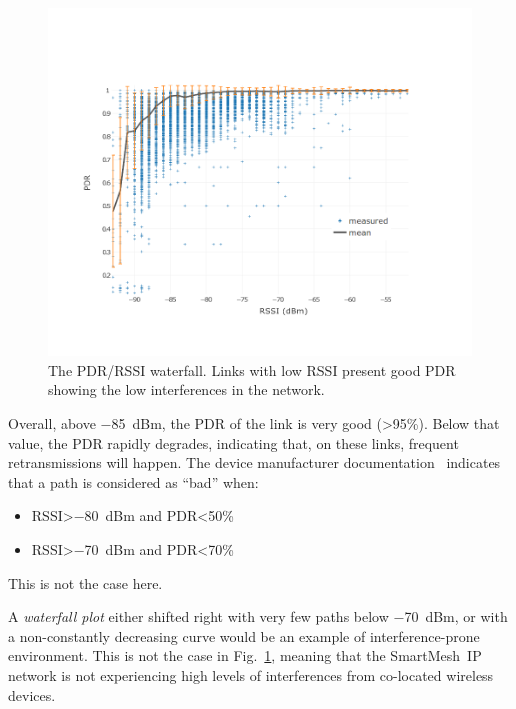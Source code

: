 \documentclass{sig-alternate}
\newcommand{\smip}                {SmartMesh~IP\xspace}
\begin{document}
\begin{figure}
    \centering
    \includegraphics[width=\columnwidth]{waterfall}
    \caption{
        The PDR/RSSI waterfall.
        Links with low RSSI present good PDR showing the low interferences in the network.
    }
    \label{fig:waterfall}
\end{figure}

Overall, above $-$85~dBm, the PDR of the link is very good (>95\%).
Below that value, the PDR rapidly degrades, indicating that, on these links, frequent retransmissions will happen.
The device manufacturer documentation~\cite{smip_app_note} indicates that a path is considered as ``bad'' when:

\begin{itemize}
  \item RSSI>$-$80~dBm and PDR<50\%
  \item RSSI>$-$70~dBm and PDR<70\%
\end{itemize}

This is not the case here.


A \textit{waterfall plot} either shifted right with very few paths below $-$70~dBm, or with a non-constantly decreasing curve would be an example of interference-prone environment.
This is not the case in Fig.~\ref{fig:waterfall}, meaning that the \smip network is not experiencing high levels of interferences from co-located wireless devices.

\end{document}

